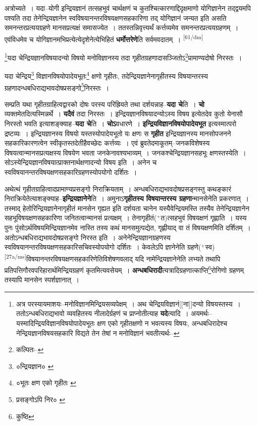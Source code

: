 \documentclass[article,12pt,a4paper]{memoir}
\newcommand{\add}[1]{($^{+}$#1)}
\begin{document}
	  \pstart अत्रोच्यते । यदा--योगी इन्द्रियज्ञानं तत्सहभुवं चार्थक्षणं च कुतश्चित्कारणाद्दिदृक्षमाणो योगिज्ञानेन तद्द्वयमपि पश्यति तदा तेनेन्द्रियज्ञानेन स्वविषयानन्तरविषयक्षणसहकारिणा तद् योगिज्ञानं जन्यत इति असति समनन्तरप्रत्ययग्रहणे मानसप्रत्यक्षं समासज्येत । ततस्तन्निवृत्त्यर्थं कर्त्तव्यमेव समनन्तरप्रत्ययग्रहणम् । एवंविधमेव च योगिज्ञानमभिप्रत्येत्येदृशेनेत्येभिहितं \textbf{धर्मोत्तरेणे}ति सर्वमवदातम् ।
	\pend
      \leavevmode\textsuperscript{\rmlatinfont\tiny [61/dm]}

	  \pstart \footnote{अत्र परस्यायमाशयः--मनोविज्ञानमिन्द्रियसव्यपेक्षम् । अथ चेन्द्रियविज्ञानं[[ना]]दन्यो विषयस्तस्य । ततोऽन्धबधिराद्यभावो व्यवहितस्य नीलादेर्ग्रहणं च प्राप्नोतीत्याह \textbf{यदे}त्यादि । अयमर्थः--यस्मादिन्द्रियविज्ञानविषयोपादेयभूतः क्षण एको गृहीतक्षणो न भवत्यस्य विषयः, अन्धबधिरादेश्च नेन्द्रियज्ञानविषयसहकारि विद्यते तेन तेषां न मनोविज्ञानं भवतीत्यर्थः--\cite{dp-msD-n}}यदा चेन्द्रियज्ञानविषयादन्यो विषयो मनोविज्ञानस्य तदा गृहीतग्रहणादासञ्जितोऽ\footnote{कल्पितः--\cite{dp-msD-n}}प्रामाण्यदोषो निरस्तः ।
	\pend
       

	  \pstart यदा चेन्द्रिय\footnote{०न्द्रियज्ञान० \cite{dp-msA} \cite{dp-msB} \cite{dp-msC} \cite{dp-edP} \cite{dp-edH} \cite{dp-edE} \cite{dp-edN}} विज्ञानविषयोपादेयभूतः\footnote{०भूतः क्षण एको गृहीतः \cite{dp-msD}} क्षणो गृहीतः, तदेन्द्रियज्ञानेनागृहीतस्य विषयान्तरस्य ग्रहणादन्धबधिराद्यभावदोषप्रसङ्गो\footnote{प्रसङ्गोऽपि निर० \cite{dp-msD}}निरस्तः ।
	\pend
      

	  \pstart सम्प्रति यथा गृहीतग्राहित्वद्वारको दोषः परस्य परिह्रियते तथा दर्शयन्नाह--\textbf{यदा चे}ति । \textbf{चो} व्यक्तमेतदित्यस्मिन्नर्थे । \textbf{यदैवं} तदा निरस्तः । इन्द्रियज्ञानविषयादन्योऽस्य विषय इत्येतदेव कुतो येनासौ निरस्तो भवति इत्याशङ्क्याह--\textbf{यदा चे}ति । \textbf{चोऽ}वधारणे । \textbf{इन्द्रियविज्ञानविषयोपादेयभूत} इत्यस्मात्परो द्रष्टव्यः । इन्द्रियज्ञानस्य विषयो यस्तस्योपादेयभूतो यः क्षणः स \textbf{गृहीत} इन्द्रियज्ञानस्य मानसोपजनने सहकारिकारणत्वेन स्वीकृतस्तदेतीहैवच्छेदः कर्त्तव्यः । एवं ब्रुवतेदमाकूतम्--जनकविशेषस्य विषयत्वान्मानसप्रत्यक्षस्य विषयेण भवता जनकेनावश्यभाव्यम् । जनकश्चेन्द्रियज्ञानसहभूः क्षणस्तस्येति । सोऽस्येन्द्रियज्ञानविषयात्प्राक्तनार्थक्षणादन्यो विषय इति । अनेन च स्वविषयानन्तरविषयक्षणसहकारिग्रहणस्योपयोगो दर्शितः ।
	\pend
      

	  \pstart अथेत्थं गृहीतग्राहित्वादप्रामाण्यप्रसङ्गो निराक्रियताम् । अन्धबधिराद्यभावदोषप्रसङ्गस्तु कथङ्कारं निराक्रियेतेत्याशङ्क्याह--\textbf{इन्द्रियज्ञानेने}ति । अमुनाऽ\textbf{गृहीतस्य विषयान्तरस्य ग्रहणा}न्मानसेनेति प्रकरणात् । तस्माद् हेतोरिन्द्रियज्ञानेनागृहीतं मानसेन गृह्यत इति दर्शयता चानेन यस्यैवेन्द्रियमस्ति तस्यैव तेनेन्द्रियज्ञानेन सहभूविषयक्षणसहकारिणा जनितत्वान्मानसं प्रत्यक्षम् । तेनागृहीतं\add{त}त्सहभुवं विषयक्षणं गृह्णाति । यस्य पुनः पुंसोऽर्थविषयमिन्द्रियज्ञानमेव नास्ति तस्य कथं मानसमुत्पद्येत, गृह्णीयाद् वा तं विषयक्षणमिति दर्शितम् । अतोऽन्धबधिराद्यभावदोषप्रसङ्गो निरस्त इति । अनेनेन्द्रियज्ञानग्रहणस्य स्वविषयानन्तरविषयक्षणसहकारिसचिवस्योपयोगो दर्शितः । केवलेऽपि ज्ञानेनेति ग्रहणे\add{स्व}\leavevmode\textsuperscript{\rmlatinfont\tiny [27a/ms]}विषयानन्तरविषयक्षणसहकारिणेतिविशेषणवलाद् यदि नामेन्द्रियज्ञानेनेति लभ्यते तथापि प्रतिपत्तिगौरवपरिहारार्थमिन्द्रियग्रहणं कृतमित्यवसेयम् । \textbf{अन्धबधिरादी}त्यत्रादिग्रहणात्काप्ति\footnote{कुष्ठि}रोगिणो ग्रहणम् तस्यापि मानसेन स्पर्शज्ञानात् ।
	\pend
      
\end{document}
